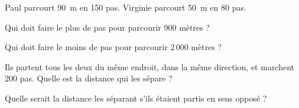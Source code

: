 \par Paul parcourt 90~m en 150 pas. Virginie parcourt 50~m en 80 pas.
\begin{myenumerate}
  \item Qui doit faire le plus de pas pour parcourir 900 mètres ?
  \item Qui doit faire le moins de pas pour parcourir 2\,000 mètres ?
  \item Ils partent tous les deux du même endroit, dans la même direction, et marchent 200 pas. Quelle est la distance qui les sépare ?
  \item Quelle serait la distance les séparant s'ils étaient partis en sens opposé ?
\end{myenumerate}